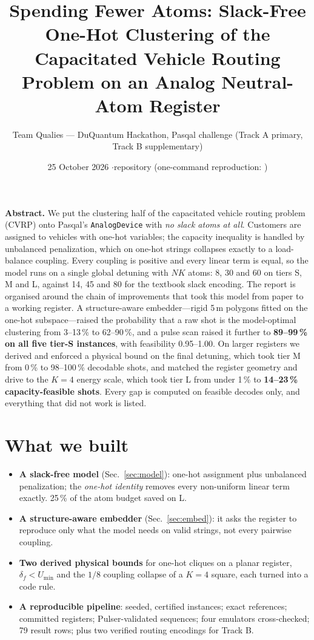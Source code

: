 \documentclass[9pt,twocolumn]{extarticle}
\title{\vspace{-1.6em}\Large\bfseries Spending Fewer Atoms: Slack-Free One-Hot Clustering of the Capacitated Vehicle Routing Problem on an Analog Neutral-Atom Register}
\author{\normalsize Team Qualies --- DuQuantum Hackathon, Pasqal challenge (Track A primary, Track B supplementary)}
\date{\normalsize 25 October 2026 \quad$\cdot$\quad repository \code{qhack/} (one-command reproduction: \code{python scripts/make.py demo})}
\newcommand{\code}[1]{\texttt{\small #1}}
\begin{document}
\maketitle
\vspace{-1.4em}

\noindent\textbf{Abstract.}
We put the clustering half of the capacitated vehicle routing problem (CVRP) onto Pasqal's \code{AnalogDevice} with \emph{no slack atoms at all}. Customers are assigned to vehicles with one-hot variables; the capacity inequality is handled by unbalanced penalization, which on one-hot strings collapses exactly to a load-balance coupling. Every coupling is positive and every linear term is equal, so the model runs on a single global detuning with $NK$ atoms: 8, 30 and 60 on tiers S, M and L, against 14, 45 and 80 for the textbook slack encoding. The report is organised around the chain of improvements that took this model from paper to a working register. A structure-aware embedder---rigid 5\,\textmu m polygons fitted on the one-hot subspace---raised the probability that a raw shot is the model-optimal clustering from 3--13\,\% to 62--90\,\%, and a pulse scan raised it further to \textbf{89--99\,\% on all five tier-S instances}, with feasibility 0.95--1.00. On larger registers we derived and enforced a physical bound on the final detuning, which took tier M from 0\,\% to 98--100\,\% decodable shots, and matched the register geometry and drive to the $K=4$ energy scale, which took tier L from under 1\,\% to \textbf{14--23\,\% capacity-feasible shots}. Every gap is computed on feasible decodes only, and everything that did not work is listed.

\section{What we built}
\begin{itemize}
\item \textbf{A slack-free model} (Sec.~\ref{sec:model}): one-hot assignment plus unbalanced penalization; the \emph{one-hot identity} removes every non-uniform linear term exactly. 25\,\% of the atom budget saved on L.
\item \textbf{A structure-aware embedder} (Sec.~\ref{sec:embed}): it asks the register to reproduce only what the model needs on valid strings, not every pairwise coupling.
\item \textbf{Two derived physical bounds} for one-hot cliques on a planar register, $\delta_f<U_{\min}$ and the $1/8$ coupling collapse of a $K=4$ square, each turned into a code rule.
\item \textbf{A reproducible pipeline}: seeded, certified instances; exact references; committed registers; Pulser-validated sequences; four emulators cross-checked; 79 result rows; plus two verified routing encodings for Track B.
\end{itemize}
\end{document}

